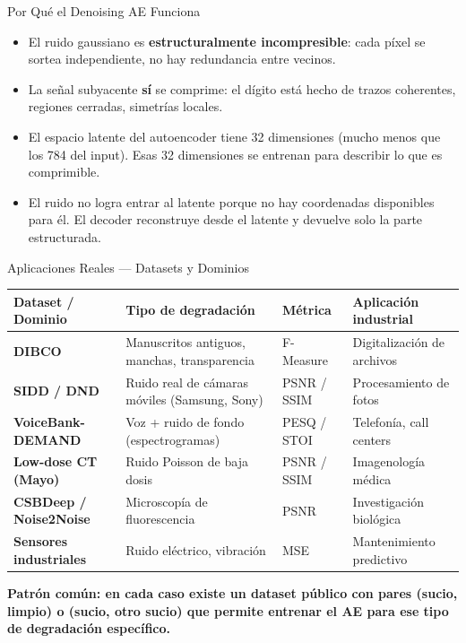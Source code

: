 \documentclass[aspectratio=169, 11pt]{beamer}
\begin{document}
\begin{frame}[shrink]{Por Qué el Denoising AE Funciona}
  \vspace{8pt}
  \begin{itemize}\setlength\itemsep{6pt}
    \item El ruido gaussiano es \textbf{estructuralmente incompresible}: cada píxel se sortea independiente, no hay redundancia entre vecinos.
    \item La señal subyacente \textbf{sí} se comprime: el dígito está hecho de trazos coherentes, regiones cerradas, simetrías locales.
    \item El espacio latente del autoencoder tiene 32 dimensiones (mucho menos que los 784 del input). Esas 32 dimensiones se entrenan para describir lo que es comprimible.
    \item El ruido no logra entrar al latente porque no hay coordenadas disponibles para él. El decoder reconstruye desde el latente y devuelve solo la parte estructurada.
  \end{itemize}
\end{frame}

\begin{frame}[shrink]{Aplicaciones Reales --- Datasets y Dominios}
  \vspace{4pt}
  {\footnotesize
  \begin{tabular}{@{}p{3.3cm} p{3.8cm} p{2.8cm} p{3.5cm}@{}}
    \toprule
    \rowcolor{arcaLightGray}
    \textbf{Dataset / Dominio} & \textbf{Tipo de degradación} & \textbf{Métrica} & \textbf{Aplicación industrial} \\
    \midrule
    \textbf{DIBCO} & Manuscritos antiguos, manchas, transparencia & F-Measure & Digitalización de archivos \\
    \textbf{SIDD / DND} & Ruido real de cámaras móviles (Samsung, Sony) & PSNR / SSIM & Procesamiento de fotos \\
    \textbf{VoiceBank-DEMAND} & Voz + ruido de fondo (espectrogramas) & PESQ / STOI & Telefonía, call centers \\
    \textbf{Low-dose CT (Mayo)} & Ruido Poisson de baja dosis & PSNR / SSIM & Imagenología médica \\
    \textbf{CSBDeep / Noise2Noise} & Microscopía de fluorescencia & PSNR & Investigación biológica \\
    \textbf{Sensores industriales} & Ruido eléctrico, vibración & MSE & Mantenimiento predictivo \\
    \bottomrule
  \end{tabular}}
  \vspace{8pt}
  {\footnotesize\color{arcaDark}\bfseries
  Patrón común: en cada caso existe un dataset público con pares (sucio, limpio) o (sucio, otro sucio) que permite entrenar el AE para ese tipo de degradación específico.}
\end{frame}
\end{document}

